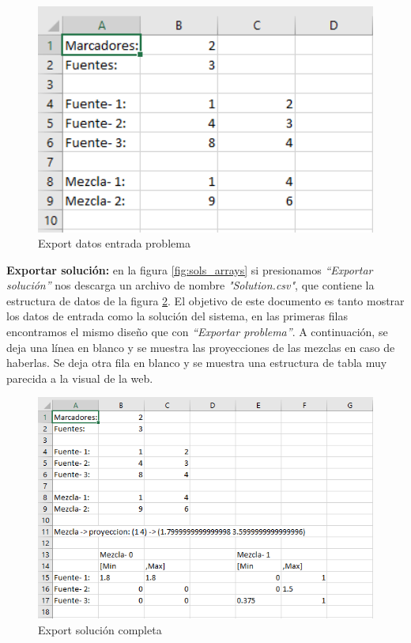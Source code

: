\begin{figure}[h!] 
\centering
    \includegraphics[width=1\textwidth]{img/inputData.PNG}
\caption{Export datos entrada problema}
\label{fig:inputData}
\end{figure}

\textbf{Exportar solución: } en la figura \ref{fig:sols_arrays} si presionamos \textit{``Exportar solución''} nos descarga un archivo de nombre \textit{"Solution.csv"}, que contiene la estructura de datos de la figura \ref{fig:solution}. El objetivo de este documento es tanto mostrar los datos de entrada como la solución del sistema, en las primeras filas encontramos el mismo diseño que con \textit{``Exportar problema''}. A continuación, se deja una línea en blanco y se muestra las proyecciones de las mezclas en caso de haberlas. Se deja otra fila en blanco y se muestra una estructura de tabla muy parecida a la visual de la web.

\begin{figure}[h!] 
\centering
    \includegraphics[width=1\textwidth]{img/solution.PNG}
\caption{Export solución completa}
\label{fig:solution}
\end{figure}

